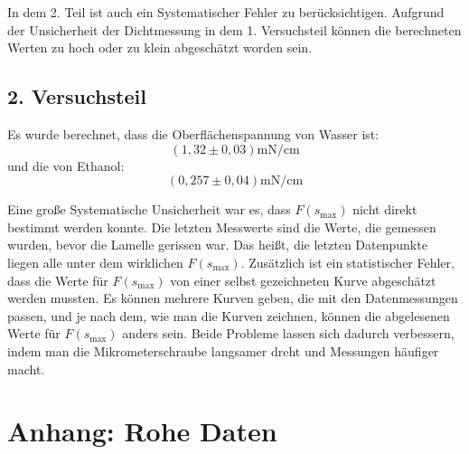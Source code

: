 \documentclass[11pt,a4paper]{article} %
\begin{document}
In dem 2. Teil ist auch ein Systematischer Fehler zu berücksichtigen. Aufgrund der Unsicherheit der Dichtmessung in dem 1. Versuchsteil können die berechneten Werten zu hoch oder zu klein abgeschätzt worden sein.

\subsection{2. Versuchsteil}
Es wurde berechnet, dass die Oberflächenspannung von Wasser ist:
$$(1,32\pm 0,03) \textrm{mN/cm}$$
und die von Ethanol:
$$(0,257 \pm 0,04) \textrm{mN/cm}$$

Eine große Systematische Unsicherheit war es, dass  $F(s_\textrm{max})$ nicht direkt bestimmt werden konnte. Die letzten Messwerte sind die Werte, die gemessen wurden, bevor die Lamelle gerissen war. Das heißt, die letzten Datenpunkte liegen alle unter dem wirklichen $F(s_\text{max})$. Zusätzlich ist ein statistischer Fehler, dass die Werte für $F(s_\textrm{max})$ von einer selbst gezeichneten Kurve abgeschätzt werden mussten. Es können mehrere Kurven geben, die mit den Datenmessungen passen, und je nach dem, wie man die Kurven zeichnen, können die abgelesenen Werte für $F(s_\textrm{max})$ anders sein. Beide Probleme lassen sich dadurch verbessern, indem man die Mikrometerschraube langsamer dreht und Messungen häufiger macht. 

\newpage
\section{Anhang: Rohe Daten}
\end{document}
